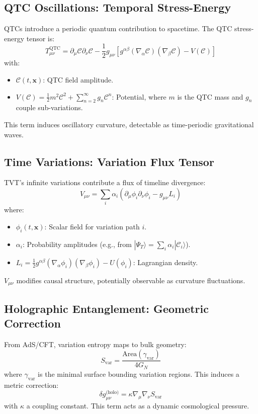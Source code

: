 \documentclass{article}
\theoremstyle{plain}
\theoremstyle{claimstyle}
\begin{document}
\subsection{QTC Oscillations: Temporal Stress-Energy}
QTCs introduce a periodic quantum contribution to spacetime. The QTC stress-energy tensor is:
\begin{equation}
T_{\mu\nu}^{\text{QTC}} = \partial_\mu \mathcal{C} \partial_\nu \mathcal{C} - \frac{1}{2} g_{\mu\nu} \left[ g^{\alpha\beta} (\nabla_\alpha \mathcal{C})(\nabla_\beta \mathcal{C}) - V(\mathcal{C}) \right]
\end{equation}
with:
\begin{itemize}
    \item \( \mathcal{C}(t, \mathbf{x}) \): QTC field amplitude.
    \item \( V(\mathcal{C}) = \frac{1}{2} m^2 \mathcal{C}^2 + \sum_{n=2}^\infty g_n \mathcal{C}^n \): Potential, where \( m \) is the QTC mass and \( g_n \) couple sub-variations.
\end{itemize}
This term induces oscillatory curvature, detectable as time-periodic gravitational waves.

\subsection{Time Variations: Variation Flux Tensor}
TVT’s infinite variations contribute a flux of timeline divergence:
\begin{equation}
V_{\mu\nu} = \sum_i \alpha_i \left( \partial_\mu \phi_i \partial_\nu \phi_i - g_{\mu\nu} L_i \right)
\end{equation}
where:
\begin{itemize}
    \item \( \phi_i(t, \mathbf{x}) \): Scalar field for variation path \( i \).
    \item \( \alpha_i \): Probability amplitudes (e.g., from \( |\Psi_T\rangle = \sum_i \alpha_i |\mathcal{C}_i\rangle \)).
    \item \( L_i = \frac{1}{2} g^{\alpha\beta} (\nabla_\alpha \phi_i)(\nabla_\beta \phi_i) - U(\phi_i) \): Lagrangian density.
\end{itemize}
\( V_{\mu\nu} \) modifies causal structure, potentially observable as curvature fluctuations.

\subsection{Holographic Entanglement: Geometric Correction}
From AdS/CFT, variation entropy maps to bulk geometry:
\begin{equation}
S_{\text{var}} = \frac{\text{Area}(\gamma_{\text{var}})}{4 G_N}
\end{equation}
where \( \gamma_{\text{var}} \) is the minimal surface bounding variation regions. This induces a metric correction:
\begin{equation}
\delta g_{\mu\nu}^{\text{(holo)}} = \kappa \nabla_\mu \nabla_\nu S_{\text{var}}
\end{equation}
with \( \kappa \) a coupling constant. This term acts as a dynamic cosmological pressure.
\end{document}
